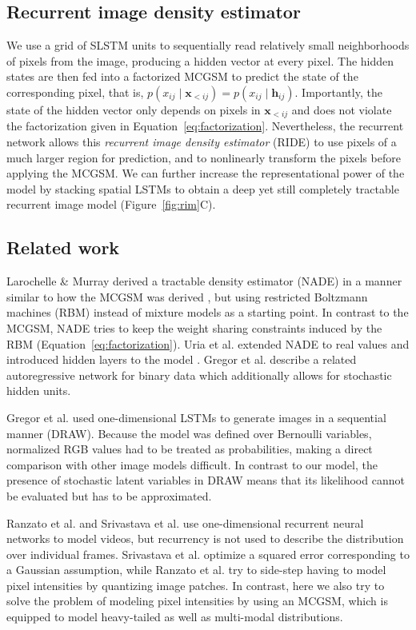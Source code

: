 \documentclass{article}
\begin{document}
		\subsection{Recurrent image density estimator}
We use a grid of SLSTM units to sequentially read relatively small neighborhoods of pixels
		from the image, producing a hidden vector at every pixel. The hidden states are then fed
		into a factorized MCGSM to predict the state of the corresponding pixel, that is,
		$p(x_{ij} \mid \mathbf{x}_{<ij}) = p(x_{ij} \mid \mathbf{h}_{ij})$.
		Importantly, the state of the hidden vector only depends on pixels in $\mathbf{x}_{<ij}$ and
		does not violate the factorization given in Equation~\ref{eq:factorization}. Nevertheless,
		the recurrent network allows this \textit{recurrent image density estimator} (RIDE) to use pixels of a much larger
		region for prediction, and to nonlinearly transform the pixels before applying the MCGSM. We
		can further increase the representational power of the model by stacking spatial LSTMs
		to obtain a deep yet still completely tractable recurrent image model (Figure~\ref{fig:rim}C).

		\subsection{Related work}
			Larochelle \& Murray \cite{Larochelle:2011} derived a tractable density estimator (NADE)
			in a manner similar to how the MCGSM was derived \cite{Theis:2012a}, but using restricted Boltzmann
			machines (RBM) instead of mixture models as a starting point. In contrast to the MCGSM,
			NADE tries to keep the weight sharing constraints induced by the RBM (Equation~\ref{eq:factorization}).
			Uria et al. extended NADE to real values \cite{Uria:2013} and introduced hidden layers to the
			model \cite{Uria:2014}. Gregor et al. \cite{Gregor:2014} describe a related
			autoregressive network for binary data which additionally allows for stochastic hidden units.

			Gregor et al. \cite{Gregor:2015} used one-dimensional LSTMs to generate images in a sequential
			manner (DRAW). Because the model was defined over Bernoulli variables,
			normalized RGB values had to be treated as probabilities, making a direct comparison with
			other image models difficult. In contrast to our model, the presence of stochastic latent variables
			in DRAW means that its likelihood cannot be evaluated but has to be approximated.

			Ranzato et al. \cite{Ranzato:2014} and Srivastava et al. \cite{Srivastava:2015} use
			one-dimensional recurrent neural networks to model videos, but recurrency is not used to
			describe the distribution over individual frames. Srivastava et al. \cite{Srivastava:2015}
			optimize a squared error corresponding to a Gaussian assumption, while Ranzato et
			al. \cite{Ranzato:2014} try to side-step having to model pixel intensities by quantizing image patches. In
			contrast, here we also try to solve the problem of modeling pixel intensities by using
			an MCGSM, which is equipped to model heavy-tailed as well as multi-modal distributions.
\end{document}
